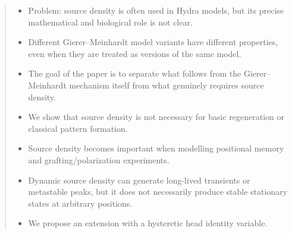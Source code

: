\begin{abstract}
\begin{itemize}
    \item Problem: source density is often used in Hydra models, but its precise mathematical and biological role is not clear.
    \item Different Gierer--Meinhardt model variants have different properties, even when they are treated as versions of the same model.
    \item The goal of the paper is to separate what follows from the Gierer--Meinhardt mechanism itself from what genuinely requires source density.
    \item We show that source density is not necessary for basic regeneration or classical pattern formation.
    \item Source density becomes important when modelling positional memory and grafting/polarization experiments.
    \item Dynamic source density can generate long-lived transients or metastable peaks, but it does not necessarily produce stable stationary states at arbitrary positions.
    \item We propose an extension with a hysteretic head identity variable.
\end{itemize}
\end{abstract}

